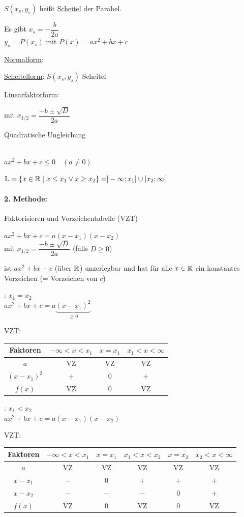 \begin{enumerate}[A)]
	$S(x_s,y_s)$ heißt \ul{Scheitel} der Parabel.
	
	Es gibt $x_s = -\dfrac{b}{2a}$\\
	$y_s=P(x_s)$ mit $P(x)=ax^2+bx+c$
	
	\ul{Normalform}:
	
	\ul{Scheitelform}:
	\qquad $S(x_s,y_s)$ Scheitel
	
	\ul{Linearfaktorform}:
	
	mit $x_{1/2}=\dfrac{-b\pm\sqrt{D}}{2a}$
	
	\clearpage
	{\bf \item Quadratische Ungleichung}\\
	$ax^2+bx+c\le0\quad (a\ne0)$
	
	$\mathbb{L}=\{x\in\mathbb{R}\mid x\le x_1 \lor x\ge x_2\}\\
	=]-\infty;x_1]\cup[x_2;\infty[$
	
	\clearpage
	\paragraph{2. Methode:} Faktorisieren und Vorzeichentabelle (VZT)
	
	$ax^2+bx+c=a(x-x_1)(x-x_2)$\\
	mit $x_{1/2}=\dfrac{-b\pm\sqrt{D}}{2a}$ (falls $D\ge 0$)
	
	 ist $ax^2+bx+c$ (über $\mathbb{R}$) unzerlegbar und hat für alle $x\in\mathbb{R}$ ein konstantes Vorzeichen (= Vorzeichen von $c$)
	
	: $x_1 = x_2$\\
	$ax^2+bx+c=a\underbrace{(x-x_1)^2}_{\ge0}$
	
	VZT:\\
	\begin{tabular}{c|c|c|c}
		Faktoren & $-\infty<x<x_1$ & $x=x_1$ & $x_1<x<\infty$\\
		\hline
		$a$ & VZ & VZ & VZ \\
		$(x-x_1)^2$ & $+$ & $0$ & $+$ \\
		\hline
		$f(x)$ & VZ & $0$ & VZ \\
	\end{tabular}
	
	: $x_1 < x_2$\\
	$ax^2+bx+c=a(x-x_1)(x-x_2)$
	
	VZT:\\
	\begin{tabular}{c|c|c|c|c|c}
		Faktoren & $-\infty<x<x_1$ & $x=x_1$ & $x_1<x<x_2$ & $x=x_2$ & $x_2<x<\infty$\\
		\hline
		$a$ & VZ & VZ & VZ & VZ & VZ \\
		$x-x_1$ & $-$ & $0$ & $+$ & $+$ & $+$ \\
		$x-x_2$ & $-$ & $-$ & $-$ & $0$ & $+$ \\
		\hline
		$f(x)$ & VZ & $0$ & VZ & $0$ & VZ \\
	\end{tabular}
	

\end{enumerate}
